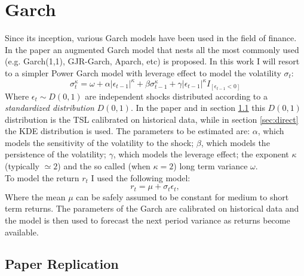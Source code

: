 \documentclass[12pt]{article}
\begin{document}
    \section{Garch} \label{sec:garch}
        Since its inception, various Garch models have been used in the field of finance.
        In the paper \cite{thorsten} an augmented Garch model that nests all the most commonly used (e.g. Garch(1,1), GJR-Garch, Aparch, etc) is proposed.
        In this work I will resort to a simpler Power Garch model with leverage effect to model the volatility $\sigma_t$:
        \begin{equation}
            \sigma_t^\kappa = \omega
            + \alpha \left|\epsilon_{t-1}\right|^\kappa
            + \beta \sigma_{t-1}^\kappa
            + \gamma \left|\epsilon_{t-1}\right|^\kappa I_{[\epsilon_{t-1}<0]}
        \end{equation}
        Where $\epsilon_t \sim D(0,1)$ are independent shocks distributed according to a \textit{standardized distribution} $D(0,1)$.
        In the paper \cite{thorsten} and in section \ref{sec:replication} this $D(0,1)$ distribution is the TSL calibrated on historical data, while in section \ref{sec:direct} the KDE distribution is used.
        The parameters to be estimated are: $\alpha$, which models the sensitivity of the volatility to the shock; $\beta$, which models the persistence of the volatility; $\gamma$, which models the leverage effect; the exponent $\kappa$ (typically $\simeq 2$) and the so called (when $\kappa=2$) long term variance $\omega$.\\
        To model the return $r_t$ I used the following model:
        \begin{equation}
                r_t = \mu + \sigma_t \epsilon_t,
        \end{equation}
        Where the mean $\mu$ can be safely assumed to be constant for medium to short term returns.
        The parameters of the Garch are calibrated on historical data and the model is then used to forecast the next period variance as returns become available.


    \subsection{Paper Replication} \label{sec:replication}
\end{document}
